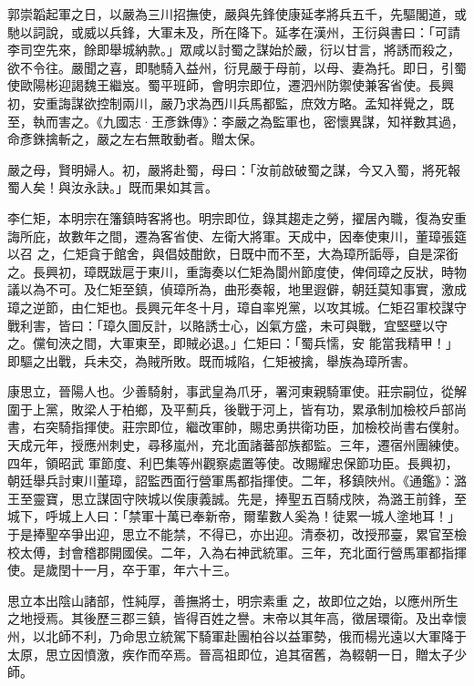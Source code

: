 \begin{pinyinscope}
 郭崇韜起軍之日，以嚴為三川招撫使，嚴與先鋒使康延孝將兵五千，先驅閣道，或馳以詞說，或威以兵鋒，大軍未及，所在降下。延孝在漢州，王衍與書曰：「可請李司空先來，餘即舉城納款。」眾咸以討蜀之謀始於嚴，衍以甘言，將誘而殺之，欲不令往。嚴聞之喜，即馳騎入益州，衍見嚴于母前，以母、妻為托。即日，引蜀使歐陽彬迎謁魏王繼岌。蜀平班師，會明宗即位，遷泗州防禦使兼客省使。長興
 初，安重誨謀欲控制兩川，嚴乃求為西川兵馬都監，庶效方略。孟知祥覺之，既至，執而害之。《九國志·王彥銖傳》：李嚴之為監軍也，密懷異謀，知祥數其過，命彥銖擒斬之，嚴之左右無敢動者。贈太保。



 嚴之母，賢明婦人。初，嚴將赴蜀，母曰：「汝前啟破蜀之謀，今又入蜀，將死報蜀人矣！與汝永訣。」既而果如其言。



 李仁矩，本明宗在籓鎮時客將也。明宗即位，錄其趨走之勞，擢居內職，復為安重誨所庇，故數年之間，遷為客省使、左衛大將軍。天成中，因奉使東川，董璋張筵以召
 之，仁矩貪于館舍，與倡妓酣飲，日既中而不至，大為璋所詬辱，自是深銜之。長興初，璋既跋扈于東川，重誨奏以仁矩為閬州節度使，俾伺璋之反狀，時物議以為不可。及仁矩至鎮，偵璋所為，曲形奏報，地里遐僻，朝廷莫知事實，激成璋之逆節，由仁矩也。長興元年冬十月，璋自率兇黨，以攻其城。仁矩召軍校謀守戰利害，皆曰：「璋久圖反計，以賂誘士心，凶氣方盛，未可與戰，宜堅壁以守之。儻旬浹之間，大軍東至，即賊必退。」仁矩曰：「蜀兵懦，安
 能當我精甲！」即驅之出戰，兵未交，為賊所敗。既而城陷，仁矩被擒，舉族為璋所害。



 康思立，晉陽人也。少善騎射，事武皇為爪牙，署河東親騎軍使。莊宗嗣位，從解圍于上黨，敗梁人于柏鄉，及平薊兵，後戰于河上，皆有功，累承制加檢校戶部尚書，右突騎指揮使。莊宗即位，繼改軍帥，賜忠勇拱衛功臣，加檢校尚書右僕射。天成元年，授應州刺史，尋移嵐州，充北面諸蕃部族都監。三年，遷宿州團練使。四年，領昭武
 軍節度、利巴集等州觀察處置等使。改賜耀忠保節功臣。長興初，朝廷舉兵討東川董璋，詔監西面行營軍馬都指揮使。二年，移鎮陜州。《通鑑》：潞王至靈寶，思立謀固守陜城以俟康義誠。先是，捧聖五百騎戍陜，為潞王前鋒，至城下，呼城上人曰：「禁軍十萬已奉新帝，爾輩數人奚為！徒累一城人塗地耳！」于是捧聖卒爭出迎，思立不能禁，不得已，亦出迎。清泰初，改授邢臺，累官至檢校太傅，封會稽郡開國侯。二年，入為右神武統軍。三年，充北面行營馬軍都指揮使。是歲閏十一月，卒于軍，年六十三。



 思立本出陰山諸部，性純厚，善撫將士，明宗素重
 之，故即位之始，以應州所生之地授焉。其後歷三郡三鎮，皆得百姓之譽。末帝以其年高，徵居環衛。及出幸懷州，以北師不利，乃命思立統駕下騎軍赴團柏谷以益軍勢，俄而楊光遠以大軍降于太原，思立因憤激，疾作而卒焉。晉高祖即位，追其宿舊，為輟朝一日，贈太子少師。




\end{pinyinscope}

